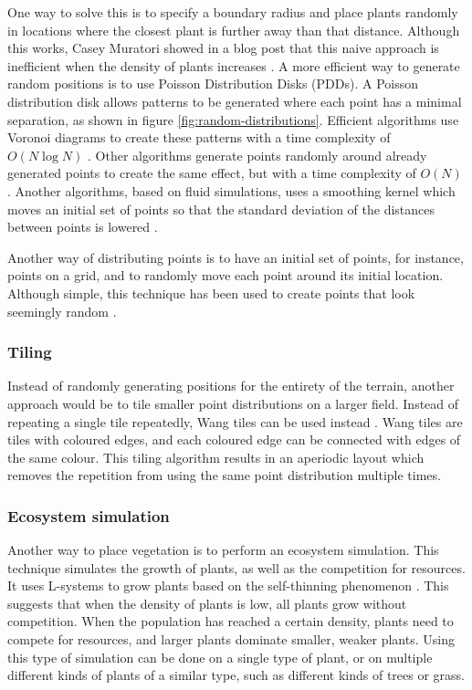 One way to solve this is to specify a boundary radius and place plants randomly in locations where the closest plant is further away than that distance. Although this works, Casey Muratori showed in a blog post that this naive approach is inefficient when the density of plants increases \cite{muratori_color_2014}. A more efficient way to generate random positions is to use Poisson Distribution Disks (PDDs). A Poisson distribution disk allows patterns to be generated where each point has a minimal separation, as shown in figure \ref{fig:random-distributions}. Efficient algorithms use Voronoi diagrams to create these patterns with a time complexity of $O(N \log{} N)$ \cite{jones_efficient_2006}. Other algorithms generate points randomly around already generated points to create the same effect, but with a time complexity of $O(N)$ \cite{bridson_fast_2007}. Another algorithms, based on fluid simulations, uses a smoothing kernel which moves an initial set of points so that the standard deviation of the distances between points is lowered \cite{jiang_blue_2015}.

Another way of distributing points is to have an initial set of points, for instance, points on a grid, and to randomly move each point around its initial location. Although simple, this technique has been used to create points that look seemingly random \cite{hammes_modeling_2001} \cite{van_muijden_gpu-based_2017}.

\subsubsection{Tiling}
Instead of randomly generating positions for the entirety of the terrain, another approach would be to tile smaller point distributions on a larger field. Instead of repeating a single tile repeatedly, Wang tiles can be used instead \cite{cohen_wang_2003}. Wang tiles are tiles with coloured edges, and each coloured edge can be connected with edges of the same colour. This tiling algorithm results in an aperiodic layout which removes the repetition from using the same point distribution multiple times.

\subsubsection{Ecosystem simulation} \label{sec:background/ecosystemsim}
Another way to place vegetation is to perform an ecosystem simulation. This technique simulates the growth of plants, as well as the competition for resources. It uses L-systems to grow plants based on the self-thinning phenomenon \cite{deussen_realistic_1998} \cite{lane_generating_2002}. This suggests that when the density of plants is low, all plants grow without competition. When the population has reached a certain density, plants need to compete for resources, and larger plants dominate smaller, weaker plants. Using this type of simulation can be done on a single type of plant, or on multiple different kinds of plants of a similar type, such as different kinds of trees or grass.

